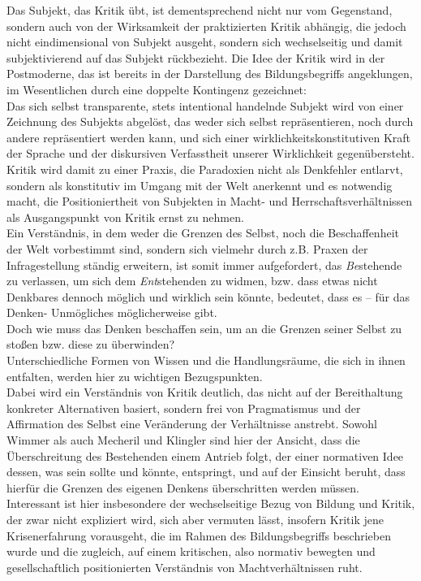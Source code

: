 \noindent Das Subjekt, das Kritik übt, ist dementsprechend nicht nur vom Gegenstand,
sondern auch von der Wirksamkeit der praktizierten Kritik abhängig, die jedoch
nicht eindimensional von Subjekt ausgeht, sondern sich wechselseitig und damit
subjektivierend auf das Subjekt rückbezieht. 
Die Idee der Kritik wird in der
Postmoderne, das ist bereits in der Darstellung des Bildungsbegriffs
angeklungen, im Wesentlichen durch eine doppelte Kontingenz gezeichnet:\\
 Das
sich selbst transparente, stets intentional handelnde Subjekt wird von einer
Zeichnung des Subjekts abgelöst, das weder sich selbst repräsentieren, noch
durch andere repräsentiert werden kann, und sich einer
\glqq wirklichkeitskonstitutiven Kraft der Sprache und der diskursiven Verfasstheit
unserer Wirklichkeit\grqq\footnotemark {} gegenübersteht. Kritik wird damit zu einer Praxis, die
Paradoxien nicht als Denkfehler entlarvt, sondern als konstitutiv im Umgang mit
der Welt  anerkennt und es notwendig macht, die Positioniertheit von Subjekten
in Macht- und Herrschaftsverhältnissen als Ausgangspunkt von Kritik ernst zu
nehmen.\\  

\noindent Ein Verständnis, in dem weder die Grenzen des Selbst, noch die
Beschaffenheit der Welt vorbestimmt sind, sondern sich vielmehr durch z.B.
Praxen der Infragestellung ständig erweitern, ist somit immer aufgefordert, das
\textit{Be}stehende zu verlassen, um sich dem \textit{Ent}stehenden zu widmen, bzw. \glqq dass etwas
nicht Denkbares dennoch möglich und wirklich sein könnte, bedeutet, dass es –
für das Denken- Unmögliches möglicherweise gibt.\grqq\footnotemark
{}\\

\noindent Doch wie muss das Denken beschaffen sein, um an die Grenzen seiner Selbst zu
stoßen bzw. diese zu überwinden? \\
Unterschiedliche Formen von Wissen und die
Handlungsräume, die sich in ihnen entfalten, werden hier zu wichtigen
Bezugspunkten.\\
Dabei wird ein Verständnis von Kritik deutlich, das nicht auf
der Bereithaltung konkreter Alternativen basiert, sondern frei von Pragmatismus
und der Affirmation des Selbst eine Veränderung der Verhältnisse anstrebt.
Sowohl Wimmer als auch Mecheril und Klingler sind hier der Ansicht, dass die
Überschreitung des Bestehenden einem Antrieb folgt, der einer normativen Idee
dessen, was sein sollte und könnte, entspringt, und auf der Einsicht beruht,
dass hierfür die Grenzen des eigenen Denkens überschritten werden müssen.\\
Interessant ist hier insbesondere der wechselseitige Bezug von Bildung und
Kritik, der zwar nicht expliziert wird, sich aber vermuten lässt, insofern
Kritik jene Krisenerfahrung vorausgeht, die im Rahmen des Bildungsbegriffs
beschrieben wurde und die zugleich, auf einem kritischen, also normativ
bewegten und gesellschaftlich positionierten Verständnis von Machtverhältnissen
ruht.\\


